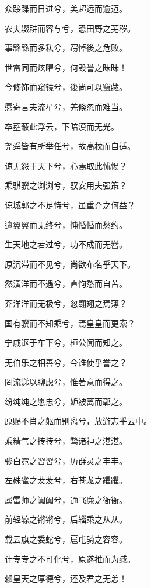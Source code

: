 \documentclass[12pt,a4paper]{ctexbook}
\begin{document}
众踥蹀而日进兮，美超远而逾迈。\par
农夫辍耕而容与兮，恐田野之芜秽。\par
事緜緜而多私兮，窃悼後之危败。\par
世雷同而炫曜兮，何毁誉之昧昧！\par
今修饰而窥镜兮，後尚可以竄藏。\par
愿寄言夫流星兮，羌倏忽而难当。\par
卒壅蔽此浮云，下暗漠而无光。\par
尧舜皆有所举任兮，故高枕而自适。\par
谅无怨于天下兮，心焉取此怵惕？\par
乘骐骥之浏浏兮，驭安用夫强策？\par
谅城郭之不足恃兮，虽重介之何益？\par
邅翼翼而无终兮，忳惛惛而愁约。\par
生天地之若过兮，功不成而无嶜。\par
原沉滞而不见兮，尚欲布名乎天下。\par
然潢洋而不遇兮，直怐愗而自苦。\par
莽洋洋而无极兮，忽翱翔之焉薄？\par
国有骥而不知乘兮，焉皇皇而更索？\par
宁戚讴于车下兮，桓公闻而知之。\par
无伯乐之相善兮，今谁使乎誉之？\par
罔流涕以聊虑兮，惟著意而得之。\par
纷纯纯之愿忠兮，妒被离而鄣之。\par
原赐不肖之躯而别离兮，放游志乎云中。\par
乘精气之抟抟兮，骛诸神之湛湛。\par
骖白霓之習習兮，历群灵之丰丰。\par
左硃雀之茇茇兮，右苍龙之躣躣。\par
属雷师之阗阗兮，通飞廉之衙衙。\par
前轻辌之锵锵兮，后辎乘之从从。\par
载云旗之委蛇兮，扈屯骑之容容。\par
计专专之不可化兮，原遂推而为臧。\par
赖皇天之厚德兮，还及君之无恙！\par
\end{document}
